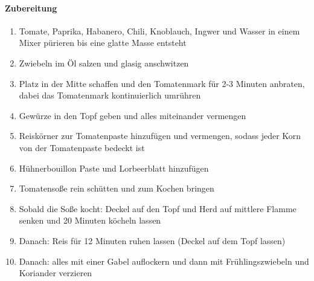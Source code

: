 \paragraph{Zubereitung}
\begin{enumerate}[noitemsep]
	\item Tomate, Paprika, Habanero, Chili, Knoblauch, Ingwer und Wasser in einem Mixer pürieren bis eine glatte Masse entsteht
	\item Zwiebeln im Öl salzen und glasig anschwitzen
	\item Platz in der Mitte schaffen und den Tomatenmark für 2-3 Minuten anbraten, dabei das Tomatenmark kontinuierlich umrühren 
	\item Gewürze in den Topf geben und alles miteinander vermengen
	\item Reiskörner zur Tomatenpaste hinzufügen und vermengen, sodass jeder Korn von der Tomatenpaste bedeckt ist
	\item Hühnerbouillon Paste und Lorbeerblatt hinzufügen
	\item Tomatensoße rein schütten und zum Kochen bringen
	\item Sobald die Soße kocht: Deckel auf den Topf und Herd auf mittlere Flamme senken und 20 Minuten köcheln lassen
	\item Danach: Reis für 12 Minuten ruhen lassen (Deckel auf dem Topf lassen)
	\item Danach: alles mit einer Gabel auflockern und dann mit Frühlingszwiebeln und Koriander verzieren
\end{enumerate}
